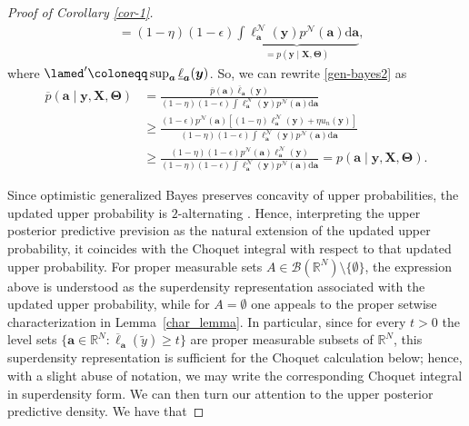 \documentclass[12pt, english, oneside, a4paper]{article}
\newcommand{\y}{\boldsymbol{y}}
\newcommand{\X}{\boldsymbol{X}}
\renewcommand{\a}{\boldsymbol{a}}
\newcommand{\bT}{\boldsymbol{\Theta}}
\begin{document}
\begin{proof}[Proof of Corollary \ref{cor-1}]
\begin{align*}
        &=(1-\eta) (1-\epsilon) \underbrace{\int \ell^\mathcal{N}_{\a}(\y) p^\mathcal{N}(\a) \text{d}\a}_{=p(\y \mid \X,\bT)},
    \end{align*}
where $\lamed^\prime \coloneqq \sup_{\a} \underline{\ell}_{\a}(\y)$. So, we can rewrite \eqref{gen-bayes2} as
\begin{align*}
    \overline{p}(\a \mid \y, \X,\bT)&=\frac{\overline{p}(\a) \overline{\ell}_{\a}(\y)}{(1-\eta) (1-\epsilon) \int \ell^\mathcal{N}_{\a}(\y) p^\mathcal{N}(\a) \text{d}\a}\\
    &\ge \frac{(1-\epsilon) p^\mathcal{N}(\a)  \left[ (1-\eta) \ell^\mathcal{N}_{\a}(\y) +\eta u_n(\y) \right]}{(1-\eta) (1-\epsilon) \int \ell^\mathcal{N}_{\a}(\y) p^\mathcal{N}(\a) \text{d}\a}\\
    &\geq \frac{ (1-\eta)(1-\epsilon) p^\mathcal{N}(\a) \ell^\mathcal{N}_{\a}(\y) }{(1-\eta) (1-\epsilon) \int \ell^\mathcal{N}_{\a}(\y) p^\mathcal{N}(\a) \text{d}\a} = {p}(\a \mid \y, \X,\bT).
\end{align*}

Since optimistic generalized Bayes preserves concavity of upper probabilities, the updated upper probability is $2$-alternating \citep{wasserman,novel_Bayes}. Hence, interpreting the upper posterior predictive prevision as the natural extension of the updated upper probability, it coincides with the Choquet integral with respect to that updated upper probability. For proper measurable sets $A\in\mathcal{B}(\mathbb{R}^N)\setminus\{\emptyset\}$, the expression above is understood as the superdensity representation associated with the updated upper probability, while for $A=\emptyset$ one appeals to the proper setwise characterization in Lemma~\ref{char_lemma}. In particular, since for every $t>0$ the level sets
\(
\{\a\in\mathbb{R}^N:\overline{\ell}_{\a}(\tilde y)\ge t\}
\)
are proper measurable subsets of $\mathbb{R}^N$, this superdensity representation is sufficient for the Choquet calculation below; hence, with a slight abuse of notation, we may write the corresponding Choquet integral in superdensity form. We can then turn our attention to the upper posterior predictive density. We have that


\end{proof}
\end{document}
